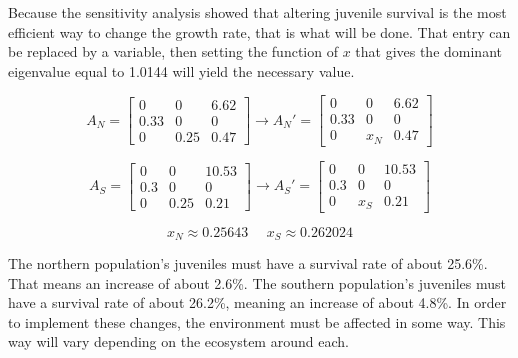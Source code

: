 \documentclass{article}
\begin{document}
    Because the sensitivity analysis showed that altering juvenile survival is the most efficient way to change the growth rate, that is what will be done.
    That entry can be replaced by a variable, then setting the function of $x$ that gives the dominant eigenvalue equal to 1.0144 will yield the necessary value.

    \begin{equation}
        A_N = \begin{bmatrix}
                  0 & 0 & 6.62 \\
                  0.33 & 0   & 0   \\
                  0   & 0.25 & 0.47
        \end{bmatrix} \longrightarrow A_N' =
        \begin{bmatrix}
            0 & 0 & 6.62 \\
            0.33 & 0   & 0   \\
            0   & x_N & 0.47
        \end{bmatrix}
    \end{equation}

    \begin{equation}
        A_S = \begin{bmatrix}
                  0 & 0 & 10.53 \\
                  0.3 & 0   & 0   \\
                  0   & 0.25 & 0.21
        \end{bmatrix} \longrightarrow A_S' =
        \begin{bmatrix}
            0 & 0 & 10.53 \\
            0.3 & 0   & 0   \\
            0   & x_S & 0.21
        \end{bmatrix}
    \end{equation}

    \begin{equation}
        x_N \approx 0.25643 \:\:\:\:\:\: x_S \approx 0.262024
    \end{equation}

    The northern population's juveniles must have a survival rate of about 25.6\%.
    That means an increase of about 2.6\%.
    The southern population's juveniles must have a survival rate of about 26.2\%, meaning an increase of about 4.8\%.
    In order to implement these changes, the environment must be affected in some way.
    This way will vary depending on the ecosystem around each.
\end{document}
